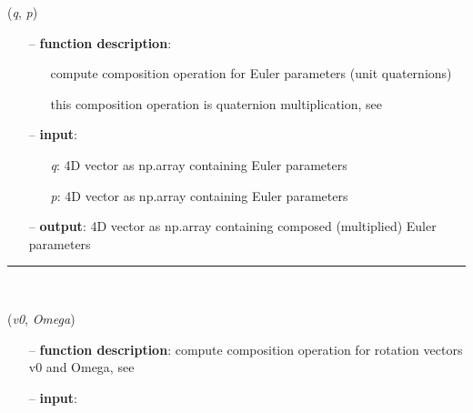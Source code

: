 \begin{itemize}[leftmargin=1.4cm]
\begin{itemize}[leftmargin=0.5cm]
\begin{itemize}[leftmargin=1.4cm]
\begin{itemize}[leftmargin=0.5cm]
\begin{itemize}[leftmargin=1.4cm]
\begin{itemize}[leftmargin=0.5cm]
\begin{itemize}[leftmargin=1.4cm]
\begin{itemize}[leftmargin=1.4cm]
\begin{itemize}[leftmargin=1.4cm]
\begin{itemize}[leftmargin=1.4cm]
\begin{itemize}[leftmargin=0.5cm]
\begin{flushleft}
\label{sec:lieGroupBasics:CompositionRuleForEulerParameters}
({\it q}, {\it p})
\end{flushleft}
\setlength{\itemindent}{0.7cm}
\begin{itemize}[leftmargin=0.7cm]
  \item[--]  {\bf function description}: \vspace{-6pt}
  \begin{itemize}[leftmargin=1.2cm]
\setlength{\itemindent}{-0.7cm}
    \item[] compute composition operation for Euler parameters (unit quaternions)
    \item[]             this composition operation is quaternion multiplication, see \cite{Terze2016}
  \end{itemize}
  \item[--]  {\bf input}: \vspace{-6pt}
  \begin{itemize}[leftmargin=1.2cm]
\setlength{\itemindent}{-0.7cm}
    \item[] {\it q}: 4D vector as np.array containing Euler parameters
    \item[] {\it   p}: 4D vector as np.array containing Euler parameters
  \end{itemize}
  \item[--]  {\bf output}: 4D vector as np.array containing composed (multiplied) Euler parameters\vspace{12pt}\end{itemize}
%
\noindent\rule{8cm}{0.75pt}\vspace{1pt} \\ 
\begin{flushleft}
\label{sec:lieGroupBasics:CompositionRuleForRotationVectors}
({\it v0}, {\it Omega})
\end{flushleft}
\setlength{\itemindent}{0.7cm}
\begin{itemize}[leftmargin=0.7cm]
  \item[--]  {\bf function description}: compute composition operation for rotation vectors v0 and Omega, see \cite{Holzinger2021}  \item[--]  {\bf input}: \vspace{-6pt}

\end{itemize}
\end{itemize}
\end{itemize}
\end{itemize}
\end{itemize}
\end{itemize}
\end{itemize}
\end{itemize}
\end{itemize}
\end{itemize}
\end{itemize}
\end{itemize}
